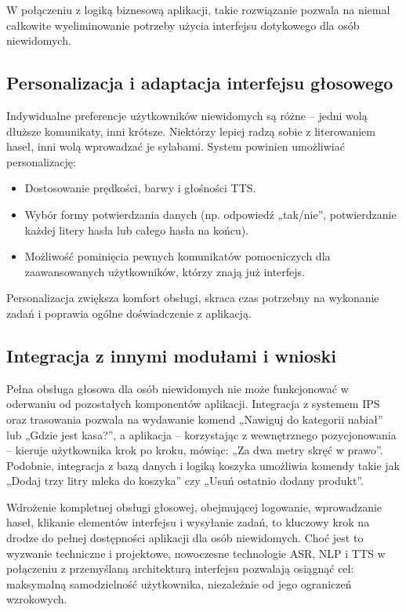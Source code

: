 W połączeniu z logiką biznesową aplikacji, takie rozwiązanie pozwala na niemal całkowite wyeliminowanie potrzeby użycia interfejsu dotykowego dla osób niewidomych.

\subsection{Personalizacja i adaptacja interfejsu głosowego}

Indywidualne preferencje użytkowników niewidomych są różne – jedni wolą dłuższe komunikaty, inni krótsze. Niektórzy lepiej radzą sobie z literowaniem haseł, inni wolą wprowadzać je sylabami. System powinien umożliwiać personalizację:

\begin{itemize} \item Dostosowanie prędkości, barwy i głośności TTS. \item Wybór formy potwierdzania danych (np. odpowiedź „tak/nie”, potwierdzanie każdej litery hasła lub całego hasła na końcu). \item Możliwość pominięcia pewnych komunikatów pomocniczych dla zaawansowanych użytkowników, którzy znają już interfejs. \end{itemize}

Personalizacja zwiększa komfort obsługi, skraca czas potrzebny na wykonanie zadań i poprawia ogólne doświadczenie z aplikacją.

\subsection{Integracja z innymi modułami i wnioski}

Pełna obsługa głosowa dla osób niewidomych nie może funkcjonować w oderwaniu od pozostałych komponentów aplikacji. Integracja z systemem IPS oraz trasowania pozwala na wydawanie komend „Nawiguj do kategorii nabiał” lub „Gdzie jest kasa?”, a aplikacja – korzystając z wewnętrznego pozycjonowania – kieruje użytkownika krok po kroku, mówiąc: „Za dwa metry skręć w prawo”. Podobnie, integracja z bazą danych i logiką koszyka umożliwia komendy takie jak „Dodaj trzy litry mleka do koszyka” czy „Usuń ostatnio dodany produkt”.

Wdrożenie kompletnej obsługi głosowej, obejmującej logowanie, wprowadzanie haseł, klikanie elementów interfejsu i wysyłanie zadań, to kluczowy krok na drodze do pełnej dostępności aplikacji dla osób niewidomych. Choć jest to wyzwanie techniczne i projektowe, nowoczesne technologie ASR, NLP i TTS w połączeniu z przemyślaną architekturą interfejsu pozwalają osiągnąć cel: maksymalną samodzielność użytkownika, niezależnie od jego ograniczeń wzrokowych.

